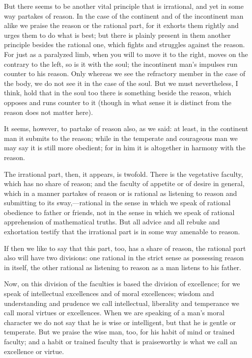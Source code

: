 But there seems to be another vital principle that is irrational, and
yet in some way partakes of reason. In the case of the continent and
of the incontinent man alike we praise the reason or the rational
part, for it exhorts them rightly and urges them to do what is best;
but there is plainly present in them another principle besides the
rational one, which fights and struggles against the reason. For just
as a paralyzed limb, when you will to move it to the right, moves on
the contrary to the left, so is it with the soul; the incontinent
man's impulses run counter to his reason. Only whereas we see the
refractory member in the case of the body, we do not see it in the
case of the soul. But we must nevertheless, I think, hold that in the
soul too there is something beside the reason, which opposes and runs
counter to it (though in what sense it is distinct from the reason
does not matter here).

It seems, however, to partake of reason also, as we said: at least, in
the continent man it submits to the reason; while in the temperate and
courageous man we may say it is still more obedient; for in him it is
altogether in harmony with the reason.

The irrational part, then, it appears, is twofold.  There is
the vegetative faculty, which has no share of reason; and the faculty
of appetite or of desire in general, which in a manner partakes of
reason or is rational as listening to reason and submitting to its
sway,---rational in the sense in which we speak of rational obedience
to father or friends, not in the sense in which we speak of rational
apprehension of mathematical truths. But all advice and all rebuke
and exhortation testify that the irrational part is in some way
amenable to reason.

If then we like to say that this part, too, has a share of reason, the
rational part also will have two divisions: one rational in the strict
sense as possessing reason in itself, the other rational as listening
to reason as a man listens to his father.

Now, on this division of the faculties is based the division of
excellence; for we speak of intellectual excellences and of moral
excellences; wisdom and understanding and prudence we call
intellectual, liberality and temperance we call moral virtues or
excellences. When we are speaking of a man's moral character we do not
say that he is wise or intelligent, but that he is gentle or
temperate. But we praise the wise man, too, for his habit of mind or
trained faculty; and a habit or trained faculty that is praiseworthy
is what we call an excellence or virtue.

